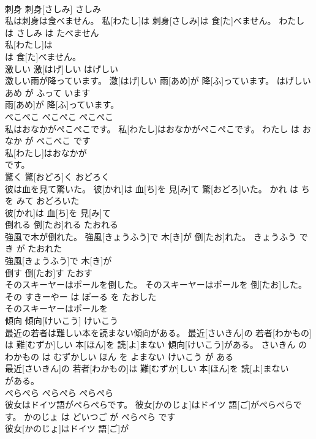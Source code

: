 \documentclass[8pt]{extreport}
\begin{document}
\begin{CJK}{UTF8}{min}
\\	刺身	刺身[さしみ]	さしみ	
\\	私は刺身は食べません。	私[わたし]は 刺身[さしみ]は 食[た]べません。	わたし は さしみ は たべません	
\\	私[わたし]は
\\	は 食[た]べません。		
\\	激しい	激[はげ]しい	はげしい	
\\	激しい雨が降っています。	激[はげ]しい 雨[あめ]が 降[ふ]っています。	はげしい あめ が ふって います	
\\	雨[あめ]が 降[ふ]っています。		
\\	ぺこぺこ	ぺこぺこ	ぺこぺこ	
\\	私はおなかがぺこぺこです。	私[わたし]はおなかがぺこぺこです。	わたし は おなか が ぺこぺこ です	
\\	私[わたし]はおなかが
\\	です。		
\\	驚く	驚[おどろ]く	おどろく	
\\	彼は血を見て驚いた。	彼[かれ]は 血[ち]を 見[み]て 驚[おどろ]いた。	かれ は ち を みて おどろいた	
\\	彼[かれ]は 血[ち]を 見[み]て
\\	倒れる	倒[たお]れる	たおれる	
\\	強風で木が倒れた。	強風[きょうふう]で 木[き]が 倒[たお]れた。	きょうふう で き が たおれた	
\\	強風[きょうふう]で 木[き]が
\\	倒す	倒[たお]す	たおす	
\\	そのスキーヤーはポールを倒した。	そのスキーヤーはポールを 倒[たお]した。	その すきーやー は ぽーる を たおした	
\\	そのスキーヤーはポールを
\\	傾向	傾向[けいこう]	けいこう	
\\	最近の若者は難しい本を読まない傾向がある。	最近[さいきん]の 若者[わかもの]は 難[むずか]しい 本[ほん]を 読[よ]まない 傾向[けいこう]がある。	さいきん の わかもの は むずかしい ほん を よまない けいこう が ある	
\\	最近[さいきん]の 若者[わかもの]は 難[むずか]しい 本[ほん]を 読[よ]まない
\\	がある。		
\\	ぺらぺら	ぺらぺら	ぺらぺら	
\\	彼女はドイツ語がぺらぺらです。	彼女[かのじょ]はドイツ 語[ご]がぺらぺらです。	かのじょ は どいつご が ぺらぺら です	
\\	彼女[かのじょ]はドイツ 語[ご]が

\end{CJK}
\end{document}
